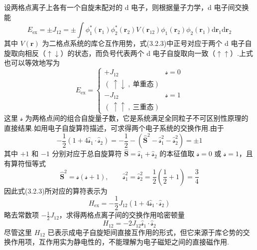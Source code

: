 设两格点离子上各有一个自旋未配对的 d 电子，则根据量子力学，d 电子间交换能
\begin{equation}
  E_{\mathrm{ex}}=\pm J_{12}=\pm\int\phi_1^{*}\left(\boldsymbol{r}_1\right)\phi_2^{*}\left(\boldsymbol{r}_2\right)
  V\left(\boldsymbol{r}_{12}\right)\phi_1\left(\boldsymbol{r}_2\right)\phi_2\left(\boldsymbol{r}_1\right)
  \mathrm{d}\boldsymbol{r}_1\mathrm{d}\boldsymbol{r}_2
\end{equation}
其中 $V\left(\boldsymbol{r}\right)$ 为二格点系统的库仑互作用势，式(3.2.3)中正号对应于两个 d 电子自旋取向相反（$\uparrow\downarrow$）的状态，而负号代表两个 d 电子自旋取向一致（$\uparrow\uparrow$）.上式也可以等效地写为
\begin{equation*}
  E_{\mathrm{ex}}=\left\{\begin{array}{ll}
    +J_{12} & \mathcal{s}=0\\
    \left(\ \uparrow\downarrow\ ,\ \text{单重态}\right) & \\
    -J_{12} & \mathcal{s}=1\\
    \left(\ \uparrow\uparrow\ ,\ \text{三重态}\right) &
  \end{array}\right.
\end{equation*}
这里 $\mathcal{s}$ 为两格点间的组合自旋量子数，它是系统满足全同粒子不可区别性原理的直接结果.如用电子自旋算符描述，可求得两个电子系统的交换作用.由于
\begin{equation*}
  -\frac{1}{2}\left(1+4\hat{\mathcal{s}}_1\cdot\hat{\mathcal{s}}_2\right)
  =-\frac{1}{2}-\left(\hat{\boldsymbol{S}}^2-\hat{\mathcal{s}}_1^2-\hat{\mathcal{s}}_2^2\right)=\pm 1
\end{equation*}
其中 $+1$ 和 $-1$ 分别对应于总自旋算符 $\hat{\boldsymbol{S}}=\hat{\mathcal{s}}_1+\hat{\mathcal{s}}_2$ 的本征值取 $\mathcal{s}=0$ 或 $\mathcal{s}=1$，且有算符恒等式
\begin{equation*}
  \hat{\boldsymbol{S}}^2=\mathcal{s}\left(\mathcal{s}+1\right),\qquad
  \hat{\mathcal{s}}_1^2=\hat{\mathcal{s}}_2^2=\frac{1}{2}\left(\frac{1}{2}+1\right)=\frac{3}{4}
\end{equation*}
因此式(3.2.3)所对应的算符表示为
\begin{equation}
  H_{\mathrm{ex}}=-\frac{1}{2}J_{12}\left(1+4\hat{\mathcal{s}}_1\cdot\hat{\mathcal{s}}_2\right)
\end{equation}
略去常数项 $-\frac{1}{2}J_{12}$，求得两格点离子间的交换作用哈密顿量
\begin{equation}
  H_{12}=-2J_{12}\hat{\mathcal{s}}_1\cdot\hat{\mathcal{s}}_2
\end{equation}
尽管这里 $H_{12}$ 已表示成电子自旋矩间直接互作用的形式，但它来源于库仑势的交换作用项，互作用实为静电性的，不能理解为电子磁矩之间的直接磁作用.


